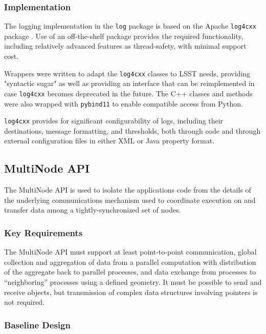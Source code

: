\documentclass[DM,lsstdraft,toc]{lsstdoc}
\begin{document}
\subsubsection{Implementation}\label{logging-implementation}

The logging implementation in the \texttt{log} package is based on the Apache
\texttt{log4cxx} package \citep{log4cxx}.
Use of an off-the-shelf package provides the required functionality, including
relatively advanced features as thread-safety, with minimal support cost.

Wrappers were written to adapt the \texttt{log4cxx} classes to LSST needs,
providing "syntactic sugar" as well as providing an interface that can be
reimplemented in case \texttt{log4cxx} becomes deprecated in the future.  The
C++ classes and methods were also wrapped with \texttt{pybind11} to enable
compatible access from Python.

\texttt{log4cxx} provides for significant configurability of logs, including
their destinations, message formatting, and thresholds, both through code and
through external configuration files in either XML or Java property format.


\subsection{MultiNode API}\label{multinode-api}

The MultiNode API is used to isolate the applications code from the details of
the underlying communications mechanism used to coordinate execution on and
transfer data among a tightly-synchronized set of nodes.

\subsubsection{Key Requirements}\label{multinode-reqs}

The MultiNode API must support at least point-to-point communication, global
collection and aggregation of data from a parallel computation with
distribution of the aggregate back to parallel processes, and data
exchange from processes to ``neighboring'' processes using a defined
geometry. It must be possible to send and receive objects, but
transmission of complex data structures involving pointers is not
required.

\subsubsection{Baseline Design}\label{multinode-design}
\end{document}

